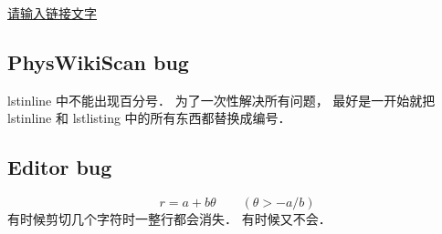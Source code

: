 

\href{http://www.example.com}{请输入链接文字}

\subsection{PhysWikiScan bug}
lstinline 中不能出现百分号． 为了一次性解决所有问题， 最好是一开始就把 lstinline 和 lstlisting 中的所有东西都替换成编号．

\subsection{Editor bug}
\begin{equation}
r = a + b\theta \qquad (\theta > -a/b)
\end{equation}
有时候剪切几个字符时一整行都会消失． 有时候又不会．

